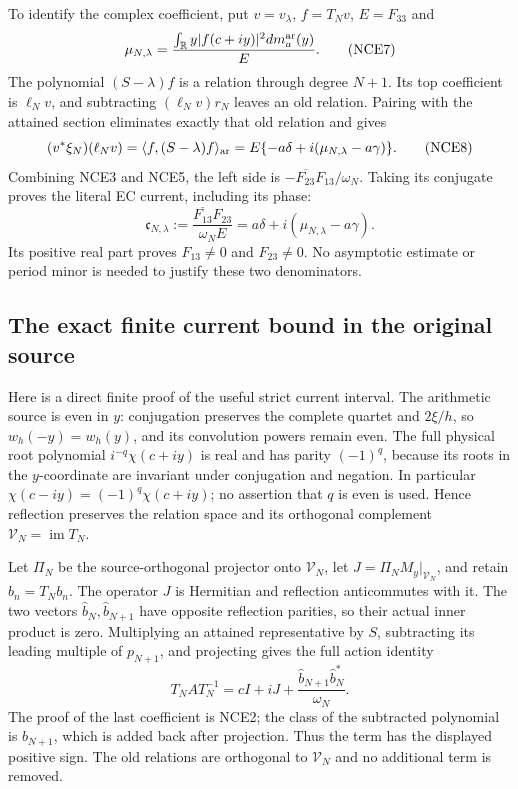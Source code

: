 To identify the complex coefficient, put $v=v_\lambda$,
$f=T_Nv$, $E=F_{33}$ and
\[
 \mu_{N,\lambda}
   =\frac{\int_{\mathbb R}y|f(c+iy)|^2dm_a^{\rm ar}(y)}{E}.
 \tag{NCE7}
\]
The polynomial $(S-\lambda)f$ is a relation through degree $N+1$.
Its top coefficient is $\ell_Nv$, and subtracting
$(\ell_Nv)r_N$ leaves an old relation. Pairing with the attained
section eliminates exactly that old relation and gives
\[
 (v^*\xi_N)(\ell_Nv)
   =\langle f,(S-\lambda)f\rangle_{\rm ar}
   =E\{-a\delta+i(\mu_{N,\lambda}-a\gamma)\}.
 \tag{NCE8}
\]
Combining NCE3 and NCE5, the left side is
$-\overline{F_{23}}F_{13}/\omega_N$. Taking its conjugate proves
the literal EC current, including its phase:
\[
 \boxed{\quad
 \mathfrak c_{N,\lambda}
 :=\frac{\overline{F_{13}}F_{23}}{\omega_NE}
 =a\delta+i(\mu_{N,\lambda}-a\gamma).
 \quad}                                                         \tag{NCE9}
\]
Its positive real part proves $F_{13}\ne0$ and $F_{23}\ne0$.
No asymptotic estimate or period minor is needed to justify these
two denominators.

\subsection{The exact finite current bound in the original source}

Here is a direct finite proof of the useful strict current interval.
The arithmetic source is even in $y$: conjugation preserves the
complete quartet and $2\xi/h$, so $w_h(-y)=w_h(y)$, and its
convolution powers remain even. The full physical root polynomial
$i^{-q}\chi(c+iy)$ is real and has parity $(-1)^q$, because its
roots in the $y$-coordinate are invariant under conjugation and negation.
In particular $\chi(c-iy)=(-1)^q\chi(c+iy)$; no assertion that
$q$ is even is used.
Hence reflection preserves the relation space and its orthogonal
complement $\mathcal V_N=\operatorname{im}T_N$.

Let $\Pi_N$ be the source-orthogonal projector onto $\mathcal V_N$,
let $J=\Pi_NM_y|_{\mathcal V_N}$, and retain
$\widehat b_n=T_Nb_n$. The operator $J$ is Hermitian and
reflection anticommutes with it. The two vectors
$\widehat b_N,\widehat b_{N+1}$ have opposite reflection parities,
so their actual inner product is zero.
Multiplying an attained representative by $S$, subtracting its
leading multiple of $p_{N+1}$, and projecting gives the full
action identity
\[
 T_NAT_N^{-1}
   =cI+iJ+
       \frac{\widehat b_{N+1}\widehat b_N^*}{\omega_N}.
 \tag{NCE10}
\]
The proof of the last coefficient is NCE2; the class of the
subtracted polynomial is $b_{N+1}$, which is added back after
projection. Thus the term has the displayed positive sign.
The old relations are orthogonal to $\mathcal V_N$ and no
additional term is removed.

